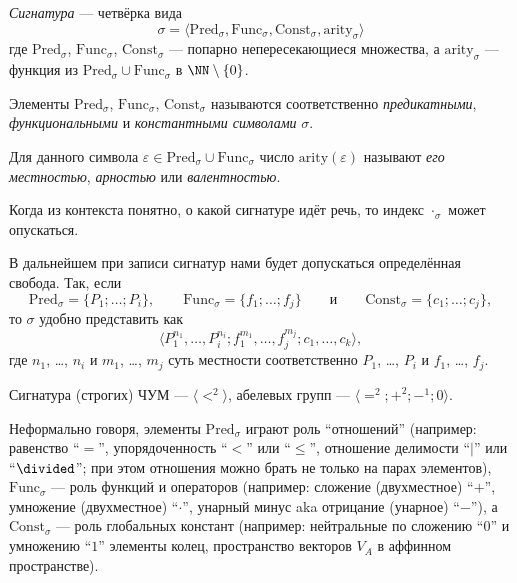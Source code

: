 \documentclass[12pt,a4paper]{article}
\newcommand{\Pred}{\ensuremath{\mathrm{Pred}}\xspace}
\newcommand{\Func}{\ensuremath{\mathrm{Func}}\xspace}
\newcommand{\Const}{\ensuremath{\mathrm{Const}}\xspace}
\newcommand{\arity}{\ensuremath{\mathrm{arity}}\xspace}
\begin{document}
    \begin{definition}
        \emph{Сигнатура} --- четвёрка вида
        \[\sigma = \langle \Pred_\sigma, \Func_\sigma, \Const_\sigma, \arity_\sigma \rangle\]
        где $\Pred_\sigma$, $\Func_\sigma$, $\Const_\sigma$ --- попарно непересекающиеся множества, а $\arity_\sigma$ --- функция из $\Pred_\sigma \cup \Func_\sigma$ в $\NN \setminus \{0\}$.

        Элементы $\Pred_\sigma$, $\Func_\sigma$, $\Const_\sigma$ называются соответственно \emph{предикатными}, \emph{функциональными} и \emph{константными символами} $\sigma$.

        Для данного символа $\varepsilon \in \Pred_\sigma \cup \Func_\sigma$ число $\arity(\varepsilon)$ называют \emph{его местностью}, \emph{арностью} или \emph{валентностью}.

        Когда из контекста понятно, о какой сигнатуре идёт речь, то индекс $\cdot_\sigma$ может опускаться.

        В дальнейшем при записи сигнатур нами будет допускаться определённая свобода. Так, если
        \[
            \Pred_\sigma = \{P_1; \dots; P_i\},
            \qquad
            \Func_\sigma = \{f_1; \dots; f_j\}
            \qquad
            \text{и}
            \qquad
            \Const_\sigma = \{c_1; \dots; c_j\},
        \]
        то $\sigma$ удобно представить как
        \[\langle P_1^{n_1}, \dots, P_i^{n_i}; f_1^{m_1}, \dots, f_j^{m_j}; c_1, \dots, c_k \rangle,\]
        где $n_1$, \dots, $n_i$ и $m_1$, \dots, $m_j$ суть местности соответственно $P_1$, \dots, $P_i$ и $f_1$, \dots, $f_j$.
    \end{definition}

    \begin{example}\hypertarget{strict-POS-signature-definition}{}
        Сигнатура (строгих) ЧУМ --- $\langle {<}^2 \rangle$, абелевых групп --- $\langle {=}^2; {+}^2; {-}^1; 0 \rangle$.
    \end{example}

    \begin{remark*}
        Неформально говоря, элементы $\Pred_\sigma$ играют роль ``отношений'' (например: равенство ``$=$'', упорядоченность ``$<$'' или ``$\leqslant$'', отношение делимости ``$\mid$'' или ``$\divided$''; при этом отношения можно брать не только на парах элементов), $\Func_\sigma$ --- роль функций и операторов (например: сложение (двухместное) ``$+$'', умножение (двухместное) ``$\cdot$'', унарный минус aka отрицание (унарное) ``$-$''), а $\Const_\sigma$ --- роль глобальных констант (например: нейтральные по сложению ``$0$'' и умножению ``$1$'' элементы колец, пространство векторов $V_A$ в аффинном пространстве).
    \end{remark*}
\end{document}
